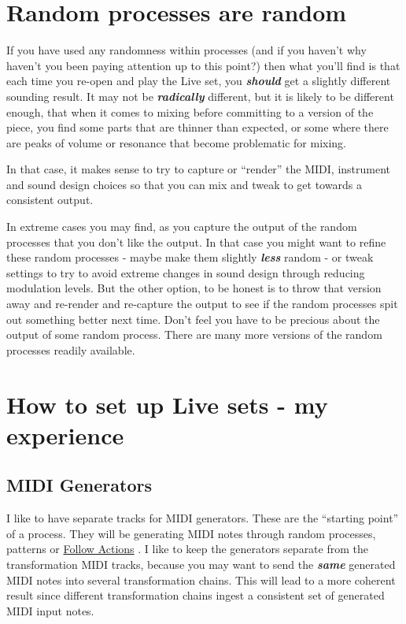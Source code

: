 \documentclass[
  12pt,
  letterpaper,
  oneside,
  open=any]{scrbook}
\begin{document}
\section{Random processes are random}\label{random-processes-are-random}

If you have used any randomness within processes (and if you haven't why
haven't you been paying attention up to this point?) then what you'll
find is that each time you re-open and play the Live set, you
\textbf{\emph{should}} get a slightly different sounding result. It may
not be \textbf{\emph{radically}} different, but it is likely to be
different enough, that when it comes to mixing before committing to a
version of the piece, you find some parts that are thinner than
expected, or some where there are peaks of volume or resonance that
become problematic for mixing.

In that case, it makes sense to try to capture or ``render'' the MIDI,
instrument and sound design choices so that you can mix and tweak to get
towards a consistent output.

In extreme cases you may find, as you capture the output of the random
processes that you don't like the output. In that case you might want to
refine these random processes - maybe make them slightly
\textbf{\emph{less}} random - or tweak settings to try to avoid extreme
changes in sound design through reducing modulation levels. But the
other option, to be honest is to throw that version away and re-render
and re-capture the output to see if the random processes spit out
something better next time. Don't feel you have to be precious about the
output of some random process. There are many more versions of the
random processes readily available.

\section{How to set up Live sets - my
experience}\label{how-to-set-up-live-sets---my-experience}

\subsection{MIDI Generators}\label{midi-generators}

I like to have separate tracks for MIDI generators. These are the
``starting point'' of a process. They will be generating MIDI notes
through random processes, patterns or
\hyperref[003-Process-Follow_Actions]{Follow Actions} . I like to keep
the generators separate from the transformation MIDI tracks, because you
may want to send the \textbf{\emph{same}} generated MIDI notes into
several transformation chains. This will lead to a more coherent result
since different transformation chains ingest a consistent set of
generated MIDI input notes.
\end{document}
